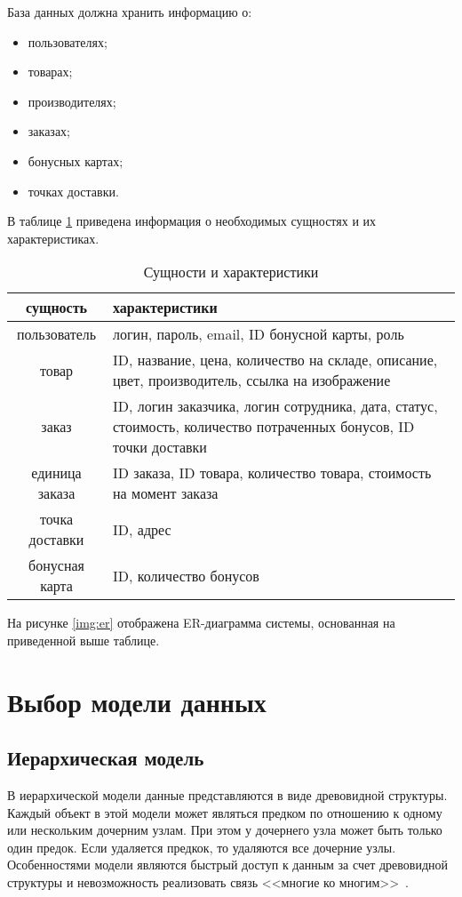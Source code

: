 База данных должна хранить информацию о:
\begin{itemize}
	\item пользователях;
	\item товарах;
	\item производителях;
	\item заказах;
	\item бонусных картах;
	\item точках доставки.
\end{itemize}

В таблице \ref{tbl:1} приведена информация о необходимых сущностях и их характеристиках.

\begin{table}[H]
	\begin{center}
	\caption{Сущности и характеристики}
	\label{tbl:1}
	\begin{tabular}{|c|p{100mm}|}
		\hline
		сущность & характеристики \\
		\hline
		пользователь & логин, пароль, email, ID бонусной карты, роль \\
		\hline
		товар & ID, название, цена, количество на складе, описание, цвет, производитель, ссылка на изображение \\
		\hline
		заказ & ID, логин заказчика, логин сотрудника, дата, статус, стоимость, количество потраченных бонусов, ID точки доставки\\
		\hline
		единица заказа & ID заказа, ID товара, количество товара, стоимость на момент заказа \\
		\hline
		точка доставки & ID, адрес \\
		\hline
		бонусная карта& ID, количество бонусов \\
		\hline
	\end{tabular}
	\end{center}
\end{table}

\clearpage
На рисунке \ref{img:er} отображена ER-диаграмма системы, основанная на приведенной выше таблице.


\section{Выбор модели данных}

\subsection{Иерархическая модель}
В иерархической модели данные представляются в виде древовидной структуры.
Каждый объект в этой модели может являться предком по отношению к одному или нескольким дочерним узлам. При этом у дочернего узла может быть только один предок. 
Если удаляется предкок, то удаляются все дочерние узлы.
Особенностями модели являются быстрый доступ к данным за счет древовидной структуры и невозможность реализовать связь <<многие ко многим>>~\cite{s2}.

